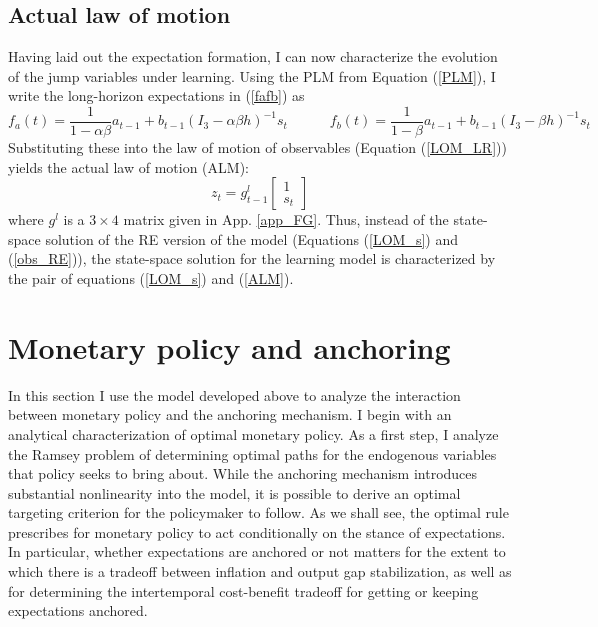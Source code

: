 \documentclass[11pt]{article}
\renewcommand{\[}{\begin{equation}}
\renewcommand{\]}{\end{equation}}
\begin{document}
\subsection{Actual law of motion}
Having laid out the expectation formation, I can now characterize the evolution of the jump variables under learning. Using the PLM from Equation (\ref{PLM}), I write the long-horizon expectations in (\ref{fafb}) as
\begin{equation}
f_a(t) = \frac{1}{1-\alpha\beta}a_{t-1}  + b_{t-1}(I_3 - \alpha\beta h)^{-1}s_t \quad \quad \quad f_b(t) = \frac{1}{1-\beta}a_{t-1}  + b_{t-1}(I_3 - \beta h)^{-1}s_t  \label{fafb_anal}
\end{equation}
Substituting these into the law of motion of observables (Equation (\ref{LOM_LR})) yields the actual law of motion (ALM):
\begin{equation}
z_t = g_{t-1}^l \begin{bmatrix} 1 \\ s_t
\end{bmatrix}
\label{ALM}
\end{equation}
where $g^l$ is a $3\times4$ matrix given in App. \ref{app_FG}. Thus, instead of the state-space solution of the RE version of the model (Equations (\ref{LOM_s}) and (\ref{obs_RE})), the state-space solution for the learning model is characterized by the pair of equations (\ref{LOM_s}) and (\ref{ALM}). 



\section{Monetary policy and anchoring}\label{analytical}

In this section I use the model developed above to analyze the interaction between monetary policy and the anchoring mechanism. I begin with an analytical characterization of optimal monetary policy. As a first step, I analyze the Ramsey problem of determining optimal paths for the endogenous variables that policy seeks to bring about.  While the anchoring mechanism introduces substantial nonlinearity into the model, it is possible to derive an optimal targeting criterion for the policymaker to follow. As we shall see, the optimal rule prescribes for monetary policy to act conditionally on the stance of expectations. In particular, whether expectations are anchored or not matters for the extent to which there is a tradeoff between inflation and output gap stabilization, as well as for determining the intertemporal cost-benefit tradeoff for getting or keeping expectations anchored. 
\end{document}

